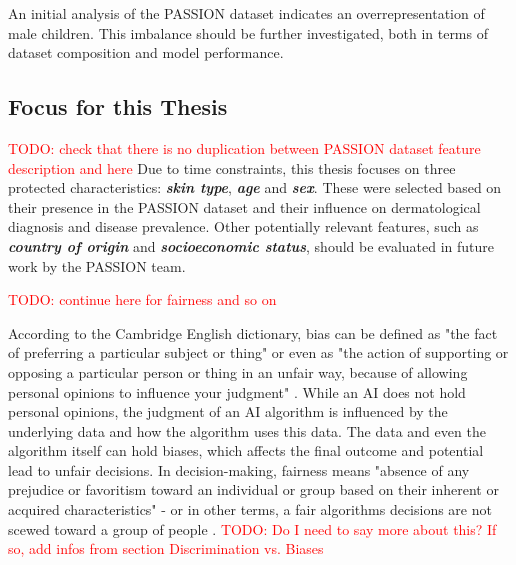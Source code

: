 \documentclass[12pt, a4paper, oneside]{book}   	%
\renewcommand{\todo}[1]{\textcolor{red}{TODO: #1}}
\newcommand{\bolditalic}[1]{\textbf{\textit{{#1}}}}
\begin{document}
		
		An initial analysis of the PASSION dataset indicates an overrepresentation of male children. This imbalance should be further investigated, both in terms of dataset composition and model performance.
		
		
		\subsection{Focus for this Thesis}
		\todo{check that there is no duplication between PASSION dataset feature description and here}
		Due to time constraints, this thesis focuses on three protected characteristics: \bolditalic{skin type}, \bolditalic{age} and \bolditalic{sex}. These were selected based on their presence in the PASSION dataset and their influence on dermatological diagnosis and disease prevalence. Other potentially relevant features, such as \bolditalic{country of origin} and \bolditalic{socioeconomic status}, should be evaluated in future work by the PASSION team.
		
		
		
		\todo{continue here for fairness and so on}
		
		
		
			According to the Cambridge English dictionary, bias can be defined as "the fact of preferring a particular subject or thing" or even as "the action of supporting or opposing a particular person or thing in an unfair way, because of allowing personal opinions to influence your judgment" \autocite{Cambridge_2025}. While an \gls{AI} does not hold personal opinions, the judgment of an \gls{AI} algorithm is influenced by the underlying data and how the algorithm uses this data. The data and even the algorithm itself can hold biases, which affects the final outcome and potential lead to unfair decisions. In decision-making, fairness means "absence of any prejudice or favoritism toward an individual or group based on their inherent or acquired characteristics" - or in other terms, a fair algorithms decisions are not scewed toward a group of people \autocite{Mehrabi_2021}. 
			\todo{Do I need to say more about this? If so, add infos from section Discrimination vs. Biases}
\end{document}
